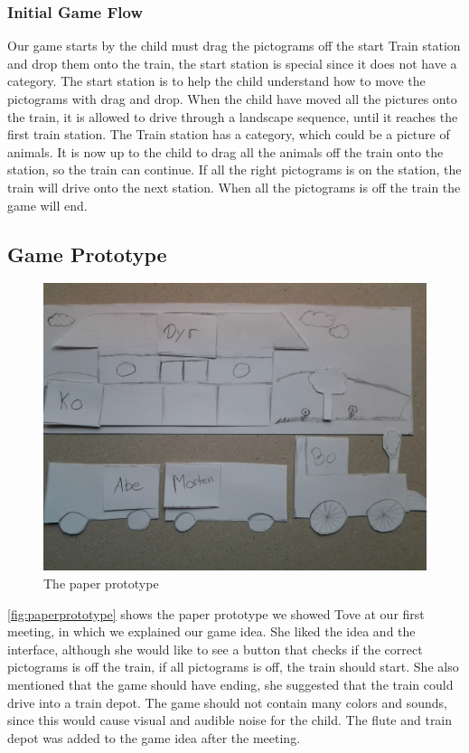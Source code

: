 \subsubsection*{Initial Game Flow}
Our game starts by the child must drag the pictograms off the start Train station and drop them onto the train, the start station is special since it does not have a category. The start station is to help the child understand how to move the pictograms with drag and drop. When the child have moved all the pictures onto the train, it is allowed to drive through a landscape sequence, until it reaches the first train station.
The Train station has a category, which could be a picture of animals. It is now up to the child to drag all the animals off the train onto the station, so the train can continue. If all the right pictograms is on the station, the train will drive onto the next station. When all the pictograms is off the train the game will end.

\subsection{Game Prototype}
\begin{figure}[H]
\centering
\includegraphics[width=0.9\linewidth]{img/screenshots/prototype1.jpg}%
\caption{The paper prototype}
\label{fig:paperprototype}
\end{figure}
\autoref{fig:paperprototype} shows the paper prototype we showed Tove at our first meeting, in which we explained our game idea. She liked the idea and the interface, although she would like to see a button that checks if the correct pictograms is off the train, if all pictograms is off, the train should start. She also mentioned that the game should have ending, she suggested that the train could drive into a train depot. The game should not contain many colors and sounds, since this would cause visual and audible noise for the child. The flute and train depot was added to the game idea after the meeting.


